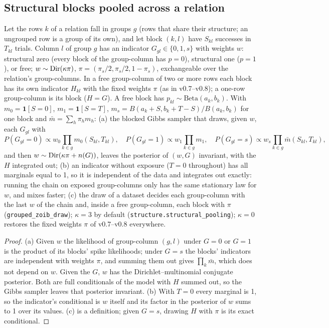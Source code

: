 \subsection{Structural blocks pooled across a relation}
\begin{proposition}\label{prop:structpool}
Let the rows $k$ of a relation fall in groups $g$ (rows that share their structure; an ungrouped row is a group of its own), and let block $(k,l)$ have $S_{kl}$ successes in $T_{kl}$ trials. Column $l$ of group $g$ has an indicator $G_{gl}\in\{0,1,s\}$ with weights $w$: structural zero (every block of the group-column has $p=0$), structural one ($p=1$), or free; $w\sim\operatorname{Dir}(\kappa\pi)$, $\pi=(\pi_s/2,\pi_s/2,1-\pi_s)$, exchangeable over the relation's group-columns. In a free group-column of two or more rows each block has its own indicator $H_{kl}$ with the fixed weights $\pi$ (as in v0.7--v0.8); a one-row group-column is its block ($H=G$). A free block has $p_{kl}\sim\mathrm{Beta}(a_k,b_k)$. With $m_0=\mathbf 1[S=0]$, $m_1=\mathbf 1[S=T]$, $m_s=B(a_k+S,b_k+T-S)/B(a_k,b_k)$ for one block and $\bar m=\sum_h\pi_h m_h$:
(a) the blocked Gibbs sampler that draws, given $w$, each $G_{gl}$ with
\[P(G_{gl}=0)\propto w_0\prod_{k\in g}m_0(S_{kl},T_{kl}),\quad P(G_{gl}=1)\propto w_1\prod_{k\in g}m_1,\quad P(G_{gl}=s)\propto w_s\prod_{k\in g}\bar m(S_{kl},T_{kl}),\]
and then $w\sim\operatorname{Dir}(\kappa\pi+n(G))$, leaves the posterior of $(w,G)$ invariant, with the $H$ integrated out;
(b) an indicator without exposure ($T=0$ throughout) has all marginals equal to 1, so it is independent of the data and integrates out exactly: running the chain on exposed group-columns only has the same stationary law for $w$, and mixes faster;
(c) the draw of a dataset decides each group-column with the last $w$ of the chain and, inside a free group-column, each block with $\pi$ (\texttt{grouped\_zoib\_draw}); $\kappa=3$ by default (\texttt{structure.structural\_pooling}); $\kappa=0$ restores the fixed weights $\pi$ of v0.7--v0.8 everywhere.
\end{proposition}
\begin{proof}
(a) Given $w$ the likelihood of group-column $(g,l)$ under $G=0$ or $G=1$ is the product of its blocks' spike likelihoods; under $G=s$ the blocks' indicators are independent with weights $\pi$, and summing them out gives $\prod_k\bar m$, which does not depend on $w$. Given the $G$, $w$ has the Dirichlet--multinomial conjugate posterior. Both are full conditionals of the model with $H$ summed out, so the Gibbs sampler leaves that posterior invariant. (b) With $T=0$ every marginal is 1, so the indicator's conditional is $w$ itself and its factor in the posterior of $w$ sums to 1 over its values. (c) is a definition; given $G=s$, drawing $H$ with $\pi$ is its exact conditional.
\end{proof}
